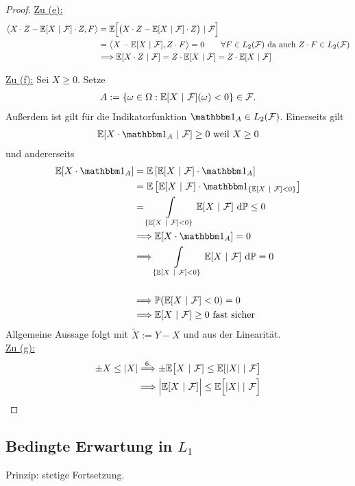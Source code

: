 \begin{proof}
\underline{Zu (e):} 
\begin{align*}
\big\langle X\cdot Z-\mathbb{E}[X~|~\mathcal{F}]\cdot Z,F\big\rangle
&=\mathbb{E}\Big[\big(X\cdot Z-\mathbb{E}[X~|~\mathcal{F}]\cdot Z\big)~|~\mathcal{F}\Big]\\
&=\big\langle X-\mathbb{E}[X~|~\mathcal{F}],Z\cdot F\big\rangle=0\qquad\forall F\in L_2(\mathcal{F})\text{ da auch }Z\cdot F\in L_2(\mathcal{F})\\
&\Longrightarrow\mathbb{E}[X\cdot Z~|~\mathcal{F}]
=Z\cdot \mathbb{E}[X~|~\mathcal{F}]
=Z\cdot\mathbb{E}[X~|~\mathcal{F}]
\end{align*}

\underline{Zu (f):} Sei $X\geq0$. Setze
\begin{align*}
A:=\lbrace\omega\in\Omega:\mathbb{E}[X~|~\mathcal{F}](\omega)<0\rbrace\in\mathcal{F}.
\end{align*}
Außerdem ist gilt für die Indikatorfunktion $\indi_A\in L_2(\mathcal{F})$.
Einerseits gilt
\begin{align*}
\E[X\cdot\indi_A~|~\mathcal{F}]\geq0\text{ weil }X\geq0
\end{align*}
und andererseits
\begin{align*}
\E[X\cdot\indi_A]
&=\E\left[\E[X~|~\mathcal{F}]\cdot\indi_A\right]\\
&=\E\left[\E[X~|~\mathcal{F}]\cdot\indi_{\lbrace\E[X~|~\mathcal{F}]<0\rbrace}\right]\\
&=\int\limits_{\lbrace\E[X~|~\mathcal{F}]<0\rbrace} \E[X~|~\mathcal{F}]\d\P\leq0\\
&\Longrightarrow\E[X\cdot\indi_A]=0\\
&\Longrightarrow\int\limits_{\lbrace\E[X~|~\mathcal{F}]<0\rbrace} \E[X~|~\mathcal{F}]\d\P=0\\\\
&\Longrightarrow \P(\E[X~|~\mathcal{F}]<0)=0\\
&\Longrightarrow\E[X~|~\mathcal{F}]\geq0\text { fast sicher}
\end{align*}
Allgemeine Aussage folgt mit $\tilde{X}:=Y-X$ und aus der Linearität.\\

\underline{Zu (g):}
\begin{align*}
\pm X\leq|X|
\stackrel{6.}{\Longrightarrow}
\pm\mathbb{E}\big[X~|~\mathcal{F}]\leq\mathbb{E}[|X|~|~\mathcal{F}\big]\\
\Longrightarrow\Big|\mathbb{E}[X~|~\mathcal{F}]\Big|\leq\mathbb{E}\Big[|X|~|~\mathcal{F}\Big]
\end{align*}
\end{proof}
 
\subsection*{Bedingte Erwartung in $L_1$}
Prinzip: stetige Fortsetzung.

